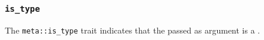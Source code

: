 
\subsubsection{\texttt{is\_type}}

The \texttt{meta::is\_type}
trait indicates that the  passed as argument is a .



